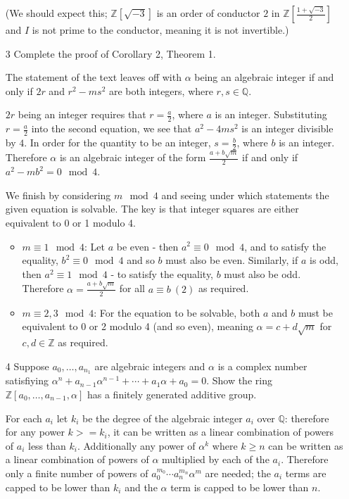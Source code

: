 \documentclass{article}
\begin{document}
\begin{enumerate}
    (We should expect this; $\mathbb{Z}[\sqrt{-3}]$ is an order of conductor $2$ in $\mathbb{Z}[\frac{1 + \sqrt{-3}}{2}]$ and $I$ is not prime to the conductor, meaning it is not invertible.)

\item[3]
    Complete the proof of Corollary 2, Theorem 1.

    The statement of the text leaves off with $\alpha$ being an algebraic integer if and only if $2r$ and $r^2 - ms^2$ are both integers, where $r, s \in \mathbb{Q}$.

    $2r$ being an integer requires that $r = \frac{a}{2}$, where $a$ is an integer.  Substituting $r = \frac{a}{2}$ into the second equation, we see that $a^2 - 4ms^2$ is an integer divisible by $4$.  In order for the quantity to be an integer, $s = \frac{b}{2}$, where $b$ is an integer.  Therefore $\alpha$ is an algebraic integer of the form $\frac{a + b\sqrt{m}}{2}$ if and only if $a^2 - mb^2 = 0 \mod 4$.

    We finish by considering $m \mod 4$ and seeing under which statements the given equation is solvable.  The key is that integer squares are either equivalent to 0 or 1 modulo 4.
    \begin{itemize}
        \item {\bf $m \equiv 1 \mod 4$}:  Let $a$ be even - then $a^2 \equiv 0 \mod 4$, and to satisfy the equality, $b^2 \equiv 0 \mod 4$ and so $b$ must also be even.  Similarly, if $a$ is odd, then $a^2 \equiv 1 \mod 4$ - to satisfy the equality, $b$ must also be odd.  Therefore $\alpha = \frac{a + b\sqrt{m}}{2}$ for all $a \equiv b\ (2)$ as required.
        \item {\bf $m \equiv 2, 3 \mod 4$}: For the equation to be solvable, both $a$ and $b$ must be equivalent to 0 or 2 modulo 4 (and so even), meaning $\alpha = c + d\sqrt{m}$ for $c, d \in \mathbb{Z}$ as required.
    \end{itemize}

\item[4]
    Suppose $a_0, \ldots, a_{n_1}$ are algebraic integers and $\alpha$ is a complex number satisfiying $\alpha^n + a_{n-1}\alpha^{n-1} + \cdots + a_1\alpha + a_0 = 0$.  Show the ring $\mathbb{Z}{[a_0, \ldots, a_{n-1}, \alpha]}$ has a finitely generated additive group.

    For each $a_i$ let $k_i$ be the degree of the algebraic integer $a_i$ over $\mathbb{Q}$: therefore for any power $k >= k_i$, it can be written as a linear combination of powers of $a_i$ less than $k_i$.  Additionally any power of $\alpha^k$ where $k \ge n$ can be written as a linear combination of powers of $\alpha$ multiplied by each of the $a_i$.  Therefore only a finite number of powers of $a_0^{m_0} \cdots a_n^{m_n} \alpha^{m}$ are needed; the $a_i$ terms are capped to be lower than $k_i$ and the $\alpha$ term is capped to be lower than $n$.


\end{enumerate}
\end{document}
